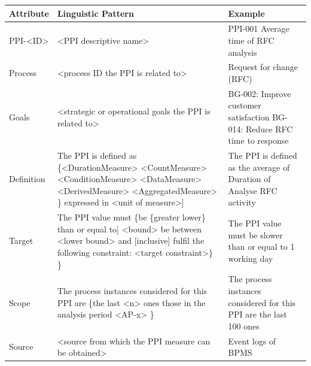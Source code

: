 \begin{table}[htbp]
	\footnotesize
	\centering
	\begin{tabular}[t]{ p{2 cm} p{5 cm} p{5 cm} }	
	\toprule
		\textbf{Attribute} & \textbf{Linguistic Pattern}  & \textbf{Example}
		\\
		\midrule
		PPI-<ID> & <PPI descriptive name> & PPI-001 Average time of RFC analysis
		\\
		\midrule
		Process	& <process ID the PPI is related to> & Request for change (RFC)
		\\
		\midrule
		Goals & <strategic or operational goals the PPI is related to> & BG-002: Improve customer satisfaction \newline
		BG-014: Reduce RFC time to response
		\\
		\midrule
		Definition & The PPI is defined as \newline \{<DurationMeasure> \newline \textbar <CountMeasure> \newline \textbar <ConditionMeasure> \newline \textbar <DataMeasure> \newline \textbar <DerivedMeasure> \newline \textbar <AggregatedMeasure> \} \newline {[}expressed in <unit of measure>{]} &  The PPI is defined as the average of Duration of Analyse RFC activity
		\\
		\midrule
		Target & The PPI value must \newline \{be \{greater \textbar lower\} than \newline {[}or equal to{]} <bound> \newline \textbar be between <lower bound> and \newline <upper bound> {[}inclusive{]} \textbar \newline fulfil the following constraint: <target constraint>\} \} & The PPI value must be slower than or equal to 1 working day
		\\
		\midrule
		Scope & The process instances considered for this PPI are \newline \{the last <n> ones \textbar those in the analysis period <AP-x> \} & The process instances considered for this PPI are the last 100 ones
		\\
		\midrule
		Source & <source from which the PPI measure can be obtained> &	Event logs of BPMS

\end{tabular}
\end{table}
